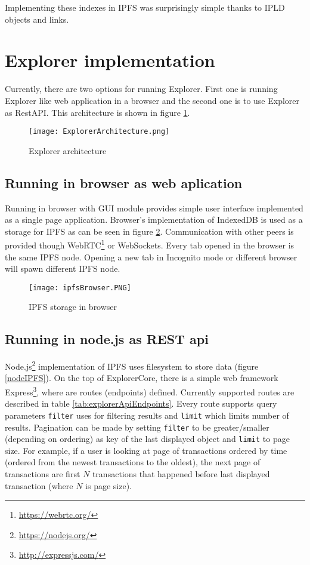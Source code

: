 Implementing these indexes in IPFS was surprisingly simple thanks to IPLD objects and links.


\section{Explorer implementation}
Currently, there are two options for running Explorer. First one is running Explorer like web application in a browser and the second one is to use Explorer as RestAPI. This architecture is shown in figure \ref{ExplorerArchitecture}.

\begin{figure}[h]
    \centering
    \texttt{[image: ExplorerArchitecture.png]}
    \caption{Explorer architecture}
    \label{ExplorerArchitecture}
\end{figure}

\subsection{Running in browser as web aplication}
Running in browser with GUI module provides simple user interface implemented as a single page application. Browser's implementation of IndexedDB is used as a storage for IPFS as can be seen in figure \ref{browserIPFS}. Communication with other peers is provided though WebRTC\footnote{\url{https://webrtc.org/}} or WebSockets. Every tab opened in the browser is the same IPFS node. Opening a new tab in Incognito mode or different browser will spawn different IPFS node.

\begin{figure}[h]
    \centering
    \texttt{[image: ipfsBrowser.PNG]}
    \caption{IPFS storage in browser}
    \label{browserIPFS}
\end{figure}


\subsection{Running in node.js as REST api }
Node.js\footnote{\url{https://nodejs.org/}} implementation of IPFS uses filesystem to store data (figure \ref{nodeIPFS}). On the top of ExplorerCore, there is a simple web framework Express\footnote{\url{http://expressjs.com/}}, where are routes (endpoints) defined. Currently supported routes are described in table \ref{tab:explorerApiEndpoints}. Every route supports query parameters \texttt{filter} uses for filtering results and \texttt{limit} which limits number of results. Pagination can be made by setting \texttt{filter} to be greater/smaller (depending on ordering) as key of the last displayed object and \texttt{limit} to page size. For example, if a user is looking at page of transactions ordered by time (ordered from the newest transactions to the oldest), the next page of transactions are first \(N\) transactions that happened before last displayed transaction (where \(N\) is page size).

